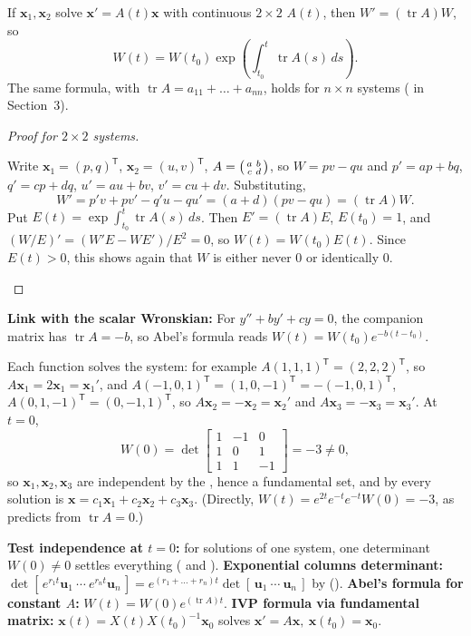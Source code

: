 \documentclass[10pt]{scrartcl}
\newcommand{\vv}[1]{\mathbf{#1}}
\DeclareMathOperator{\tr}{tr}
\begin{document}
\begin{proposition*}
  If $\vv x_1,\vv x_2$ solve $\vv x'=A(t)\vv x$ with continuous $2\times 2$ $A(t)$, then $W'=(\tr A)W$, so
  \[
    W(t) = W(t_0)\exp\left(\int_{t_0}^t \tr A(s)\,ds\right).
  \]
  The same formula, with $\operatorname{tr}A=a_{11}+\dots+a_{nn}$, holds for $n\times n$ systems ( in Section~3).
\end{proposition*}
\begin{proof}[Proof for $2\times 2$ systems]
  \begin{steps}
    \ii Write $\vv x_1=(p,q)^{\mathsf T}$, $\vv x_2=(u,v)^{\mathsf T}$, $A=\begin{psmallmatrix}a&b\\c&d\end{psmallmatrix}$, so $W=pv-qu$ and $p'=ap+bq$, $q'=cp+dq$, $u'=au+bv$, $v'=cu+dv$. Substituting,
    \[
      W' = p'v+pv'-q'u-qu' = (a+d)(pv-qu) = (\tr A)W.
    \]
    \ii Put $E(t)=\exp\int_{t_0}^t\tr A(s)\,ds$. Then $E'=(\tr A)E$, $E(t_0)=1$, and $(W/E)'=(W'E-WE')/E^2=0$, so $W(t)=W(t_0)E(t)$. Since $E(t)>0$, this shows again that $W$ is either never $0$ or identically $0$. \qedhere
  \end{steps}
\end{proof}

\noindent\textbf{Link with the scalar Wronskian:} For $y''+by'+cy=0$, the companion matrix has $\tr A=-b$, so Abel's formula reads $W(t)=W(t_0)e^{-b(t-t_0)}$.

\revisit Each function solves the system: for example $A(1,1,1)^{\mathsf T}=(2,2,2)^{\mathsf T}$, so $A\vv x_1=2\vv x_1=\vv x_1'$, and $A(-1,0,1)^{\mathsf T}=(1,0,-1)^{\mathsf T}=-(-1,0,1)^{\mathsf T}$, $A(0,1,-1)^{\mathsf T}=(0,-1,1)^{\mathsf T}$, so $A\vv x_2=-\vv x_2=\vv x_2'$ and $A\vv x_3=-\vv x_3=\vv x_3'$. At $t=0$,
\[
  W(0) = \det\begin{bmatrix}1&-1&0\\1&0&1\\1&1&-1\end{bmatrix} = -3\neq 0,
\]
so $\vv x_1,\vv x_2,\vv x_3$ are independent by the , hence a fundamental set, and by  every solution is $\vv x=c_1\vv x_1+c_2\vv x_2+c_3\vv x_3$. (Directly, $W(t)=e^{2t}e^{-t}e^{-t}W(0)=-3$, as  predicts from $\tr A=0$.)

\begin{shortcuts}
  \ii \textbf{Test independence at $t=0$:} for solutions of one system, one determinant $W(0)\neq 0$ settles everything ( and ).
  \ii \textbf{Exponential columns determinant:} $\det[\,e^{r_1 t}\vv u_1\ \cdots\ e^{r_n t}\vv u_n\,]=e^{(r_1+\dots+r_n)t}\det[\,\vv u_1\ \cdots\ \vv u_n\,]$ by ().
  \ii \textbf{Abel's formula for constant $A$:} $W(t)=W(0)e^{(\tr A)t}$.
  \ii \textbf{IVP formula via fundamental matrix:} $\vv x(t)=X(t)X(t_0)^{-1}\vv x_0$ solves $\vv x'=A\vv x,\ \vv x(t_0)=\vv x_0$.
\end{shortcuts}
\end{document}
